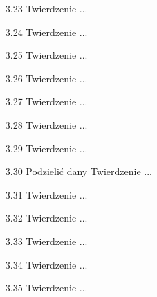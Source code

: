 \begin{enumerate}
    \item [3.23] Twierdzenie ...
    \item [3.24] Twierdzenie ...
    \item [3.25] Twierdzenie ...
    \item [3.26] Twierdzenie ...
    \item [3.27] Twierdzenie ...
    \item [3.28] Twierdzenie ...
    \item [3.29] Twierdzenie ...
    \item [3.30] Podzielić dany Twierdzenie ...
    \item [3.31] Twierdzenie ...
    \item [3.32] Twierdzenie ...
    \item [3.33] Twierdzenie ...
    \item [3.34] Twierdzenie ...
    \item [3.35] Twierdzenie ...

\end{enumerate}
